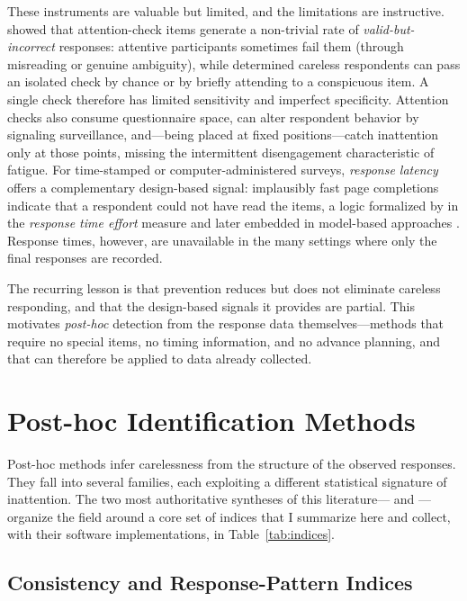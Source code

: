 These instruments are valuable but limited, and the limitations are
instructive. \textcite{curran2019paid} showed that attention-check items
generate a non-trivial rate of \emph{valid-but-incorrect} responses: attentive
participants sometimes fail them (through misreading or genuine ambiguity),
while determined careless respondents can pass an isolated check by chance or by
briefly attending to a conspicuous item. A single check therefore has limited
sensitivity and imperfect specificity. Attention checks also consume
questionnaire space, can alter respondent behavior by signaling surveillance,
and---being placed at fixed positions---catch inattention only at those points,
missing the intermittent disengagement characteristic of fatigue. For
time-stamped or computer-administered surveys, \emph{response latency} offers a
complementary design-based signal: implausibly fast page completions indicate
that a respondent could not have read the items, a logic formalized by
\textcite{wise2005response} in the \emph{response time effort} measure and later
embedded in model-based approaches \parencite{ulitzsch2022response}. Response
times, however, are unavailable in the many settings where only the final
responses are recorded.

The recurring lesson is that prevention reduces but does not eliminate careless
responding, and that the design-based signals it provides are partial. This
motivates \emph{post-hoc} detection from the response data themselves---methods
that require no special items, no timing information, and no advance planning,
and that can therefore be applied to data already collected.

\section{Post-hoc Identification Methods}

Post-hoc methods infer carelessness from the structure of the observed
responses. They fall into several families, each exploiting a different
statistical signature of inattention. The two most authoritative syntheses of
this literature---\textcite{meade2012identifying} and \textcite{curran2016methods}---organize
the field around a core set of indices that I summarize here and collect, with
their software implementations, in Table~\ref{tab:indices}.

\subsection{Consistency and Response-Pattern Indices}

